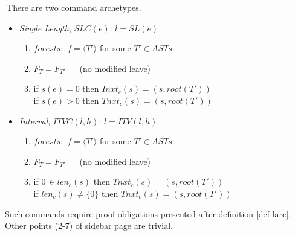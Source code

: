 \documentclass{article}
\begin{document}
\begin{definition}\label{def-carc}$~$There are two command archetypes.
\begin{itemize}
\item {\em Single Length}, $SLC(e)$: $l= SL(e)$ 
  \begin{enumerate} 
  \item $forests:$  $f=\langle T'\rangle$ for some $T'\in ASTs$
  \item $F_T=F_{T'}~~~~~~$ {\small (no modified leave)}\setcounter{enumi}{3} 
  \item  if $s(e)=0$ then $Inxt_c(s)=(s,root(T'))$\\
			   if $s(e)>0$ then $T\!nxt_c(s)=(s,root(T'))$
  \end{enumerate}
\item {\em Interval}, $ITVC(l,h)$: $l= ITV(l,h)$
  \begin{enumerate} 
  \item $forests:$  $f=\langle T'\rangle$ for some $T'\in ASTs$
  \item $F_T=F_{T'}~~~~~~$ {\small (no modified leave)}\setcounter{enumi}{3} 
  \item if $0\,\in len_c(s)$ then $T\!nxt_c(s)=(s,root(T'))$\\
			  if $len_c(s)\neq\{0\}$ then $T\!nxt_c(s)=(s,root(T'))$
  \end{enumerate}
\end{itemize}
\end{definition}
Such commands require proof obligations presented after definition \ref{def-larc}. Other points (2-7) of sidebar page \pageref{safestates} are trivial. 
\end{document}

